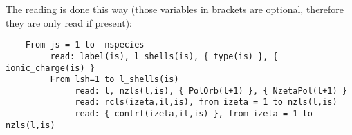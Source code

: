 \begin{description}

\noindent
The reading is done this way (those variables in brackets are optional, 
therefore they are only read if
present):

\begin{verbatim}
    From js = 1 to  nspecies 
         read: label(is), l_shells(is), { type(is) }, { ionic_charge(is) }
         From lsh=1 to l_shells(is)
              read: l, nzls(l,is), { PolOrb(l+1) }, { NzetaPol(l+1) }
              read: rcls(izeta,il,is), from izeta = 1 to nzls(l,is)
              read: { contrf(izeta,il,is) }, from izeta = 1 to nzls(l,is)
\end{verbatim}





\end{description}

